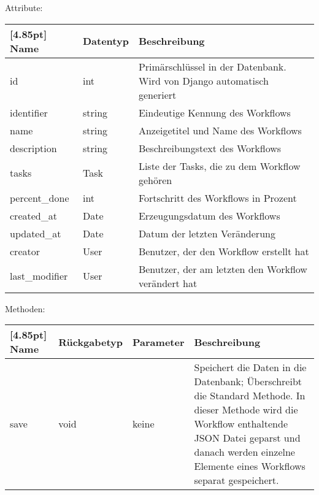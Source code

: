             Attribute:
            \begin{center}
            	\renewcommand{\arraystretch}{1.5}
	            \setlength\tabcolsep{5pt}
            	\begin{tabularx}{\textwidth}{|l|l|X|}
            		\hline
                    \rowcolor[gray]{0.75}[4.85pt]            		
            	    Name & Datentyp & Beschreibung \\ \hline
            		id & int & Primärschlüssel in der Datenbank. Wird von Django automatisch generiert \\ \hline
					identifier & string & Eindeutige Kennung des Workflows\\ \hline
					name & string & Anzeigetitel und Name des Workflows\\ \hline
					description & string & Beschreibungstext des Workflows\\ \hline				tasks & Task & Liste der Tasks, die zu dem Workflow gehören\\ \hline
					percent\_done & int & Fortschritt des Workflows in Prozent\\ \hline
					created\_at & Date & Erzeugungsdatum des Workflows \\ \hline
					updated\_at & Date & Datum der letzten Veränderung \\ \hline 
					creator & User & Benutzer, der den Workflow erstellt hat\\ \hline
					last\_modifier & User & Benutzer, der am letzten den Workflow verändert hat\\ \hline
            	\end{tabularx}
            \end{center}

        
             Methoden:
	        \begin{center}
	        	\setlength\tabcolsep{5pt}
	        	\renewcommand{\arraystretch}{1.5}
	        	
	        	\begin{tabularx}{\textwidth}{|l|l|l|X|}
	        		\hline
	        		\rowcolor[gray]{0.75}[4.85pt]
	        		Name & Rückgabetyp & Parameter & Beschreibung \\ \hline 
	        		save & void & keine & Speichert die Daten in die Datenbank; Überschreibt die Standard Methode. In dieser Methode wird die Workflow enthaltende JSON Datei geparst und danach werden einzelne Elemente eines Workflows separat gespeichert. \\ 
	        		\hline
	        	\end{tabularx}
	        \end{center}
